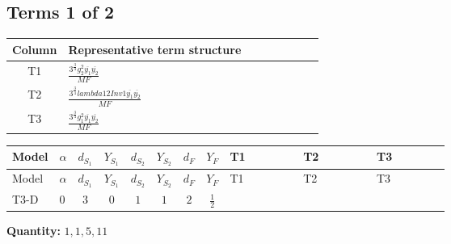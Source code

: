 \documentclass[8pt]{article}
\begin{document}
\begin{landscape}
\subsection*{Terms 1 of 2}
\begin{center}
\begin{tabular}{@{}c >{\raggedright\arraybackslash}p{0.82\linewidth}@{}}
\toprule
Column & Representative term structure \\
\midrule
T1 & \(\displaystyle \frac{3^{\frac{3}{4}} g_{2}^{2} \overline{y_{1}} \overline{y_{2}}}{MF}\) \\
\midrule
T2 & \(\displaystyle \frac{3^{\frac{3}{4}} lambda12Inv1 \overline{y_{1}} \overline{y_{2}}}{MF}\) \\
\midrule
T3 & \(\displaystyle \frac{3^{\frac{3}{4}} g_{1}^{2} \overline{y_{1}} \overline{y_{2}}}{MF}\) \\
\midrule
\bottomrule
\end{tabular}
\end{center}
\smallskip
\tiny
\begin{longtable}{@{}llcccccc >{\raggedright\arraybackslash}p{0.21\linewidth} >{\raggedright\arraybackslash}p{0.21\linewidth} >{\raggedright\arraybackslash}p{0.21\linewidth}@{}}
\toprule
Model & $\alpha$ & $d_{S_1}$ & $Y_{S_1}$ & $d_{S_2}$ & $Y_{S_2}$ & $d_F$ & $Y_F$ & T1 & T2 & T3 \\
\midrule
\endfirsthead
\toprule
Model & $\alpha$ & $d_{S_1}$ & $Y_{S_1}$ & $d_{S_2}$ & $Y_{S_2}$ & $d_F$ & $Y_F$ & T1 & T2 & T3 \\
\midrule
\endhead
T3-D & $0$ & $3$ & $0$ & $1$ & $1$ & $2$ & $\frac{1}{2}$ & \scriptsize\adjustbox{max width=\linewidth}{$\begin{gathered} - \frac{17 \cdot 3^{\frac{3}{4}} g_{2}^{2} \overline{y_{1}} \overline{y_{2}}}{24 MF}\end{gathered}$} & \scriptsize\adjustbox{max width=\linewidth}{$\begin{gathered} - \frac{3^{\frac{3}{4}} lambda12Inv1 \overline{y_{1}} \overline{y_{2}}}{6 MF}\end{gathered}$} & \scriptsize\adjustbox{max width=\linewidth}{$\begin{gathered} - \frac{3^{\frac{3}{4}} g_{1}^{2} \overline{y_{1}} \overline{y_{2}}}{8 MF}\end{gathered}$} \\
\midrule
\bottomrule
\end{longtable}
\clearpage
\noindent\textbf{Quantity: }$\mathrm{1,1,5,11}$\par\smallskip

\end{landscape}
\end{document}
